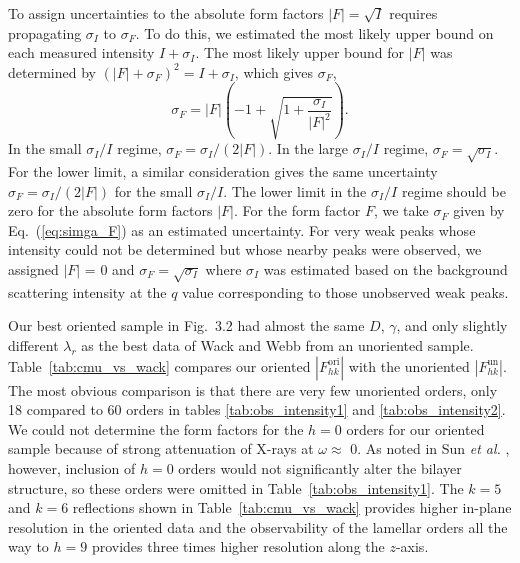 To assign uncertainties to the absolute 
form factors $|F|=\sqrt{I}$ requires propagating $\sigma_I$ to $\sigma_F$.
To do this, we estimated the most likely upper bound on each measured intensity 
$I+\sigma_I$. The most likely upper bound for $|F|$ was determined by
$(|F|+\sigma_F)^2=I+\sigma_I$, which gives $\sigma_F$,
\begin{equation}
\label{eq:simga_F}
  \sigma_F=|F|(-1+\sqrt{1+\frac{\sigma_I}{|F|^2}}).
\end{equation}
In the small $\sigma_I/I$ regime, $\sigma_F=\sigma_I/(2|F|)$. In the 
large $\sigma_I/I$ regime, $\sigma_F=\sqrt{\sigma_I}$. For the lower limit,
a similar consideration gives the same uncertainty $\sigma_F=\sigma_I/(2|F|)$
for the small $\sigma_I/I$. The lower limit in the $\sigma_I/I$ regime
should be zero for the absolute form factors $|F|$. For the form factor $F$,
we take $\sigma_F$ given by Eq.~(\ref{eq:simga_F}) as an estimated 
uncertainty. For very weak peaks whose intensity could not be determined but
whose nearby peaks were observed, we assigned $|F|$ = 0 and 
$\sigma_F = \sqrt{\sigma_I}$ where $\sigma_I$ was estimated based on the
background scattering intensity at the $q$ value corresponding to those
unobserved weak peaks. 

Our best oriented sample in Fig.~3.2 had almost the same $D$, $\gamma$, and 
only slightly different ${\lambda}_r$ as the best data of Wack and Webb 
\cite{ref:Wack89} from an unoriented sample. 
Table~\ref{tab:cmu_vs_wack} compares our oriented 
$\left|F_{hk}^\text{ori}\right|$ with the unoriented 
$\left|F_{hk}^\text{un}\right|$. The most obvious comparison is that there 
are very few unoriented orders, only 18 compared to 60 orders in tables 
\ref{tab:obs_intensity1} and \ref{tab:obs_intensity2}.
We could not determine the form factors for the $h=0$ orders for our
oriented sample because of strong attenuation of X-rays 
at $\omega \approx$ 0\textdegree.
As noted in Sun \textit{et al.} \cite{ref:Sun96}, however,
inclusion of $h=0$ orders would not significantly alter the bilayer 
structure, so these orders were omitted in Table~\ref{tab:obs_intensity1}.
The $k=5$ and $k=6$ reflections shown in Table~\ref{tab:cmu_vs_wack} provides 
higher in-plane resolution in the oriented data and the observability of the 
lamellar orders all the way to $h=9$ provides three times higher resolution 
along the $z$-axis.

